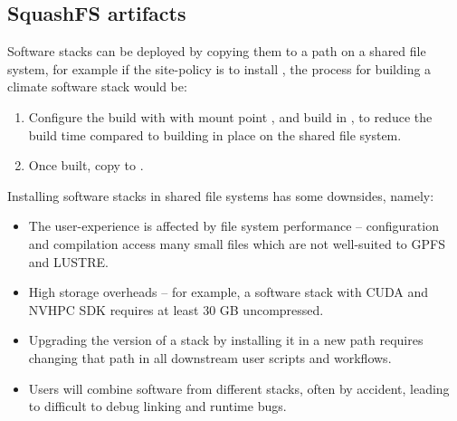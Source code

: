 \subsection{SquashFS artifacts}

Software stacks can be deployed by copying them to a path on a shared file system, for example if the site-policy is to install , the process for building a climate software stack  would be:
\begin{enumerate}
    \item Configure the build with  with mount point , and build in , to reduce the build time compared to building in place on the shared file system.
    \item Once built, copy  to .
\end{enumerate}

Installing software stacks in shared file systems has some downsides, namely:
\begin{itemize}
    \item The user-experience is affected by file system performance -- configuration and compilation access many small files which are not well-suited to GPFS and LUSTRE.
    \item High storage overheads -- for example, a software stack with CUDA and NVHPC SDK requires at least 30 GB uncompressed.
    \item Upgrading the version of a stack by installing it in a new path requires changing that path in all downstream user scripts and workflows.
    \item Users will combine software from different stacks, often by accident, leading to difficult to debug linking and runtime bugs.
\end{itemize}

